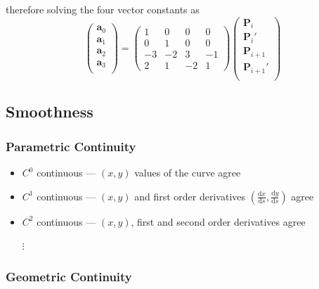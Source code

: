 \documentclass[twocolumn,landscape,10pt]{article}
\theoremstyle{definition}
\begin{document}
\begin{itemize}
\[        \]
        therefore solving the four vector constants as
        \[
            \begin{pmatrix}
                \mathbf{a}_0 \\
                \mathbf{a}_1 \\
                \mathbf{a}_2 \\
                \mathbf{a}_3 \\
            \end{pmatrix} 
            =
            \begin{pmatrix}
                1 & 0 & 0 & 0 \\
                0 & 1 & 0 & 0 \\
                -3 & -2 & 3 & -1 \\
                2 & 1 & -2 & 1
            \end{pmatrix} 
            \begin{pmatrix}
                \mathbf{P}_i \\
                \mathbf{P}_i' \\
                \mathbf{P}_{i+1} \\
                \mathbf{P}_{i+1}' \\
            \end{pmatrix} 
        \]
\end{itemize} 

\subsection{Smoothness}

\subsubsection{Parametric Continuity}

\begin{itemize}
    \item $C^0$ continuous --- $(x,y)$ values of the curve agree
    \item $C^1$ continuous --- $(x,y)$ and first order derivatives 
        $\left(\frac{\mathrm{d}x}{\mathrm{d}s},\frac{\mathrm{d}y}{\mathrm{d}s}\right)$
        agree
    \item $C^2$ continuous --- $(x,y)$, first and second order
        derivatives agree
    \item[$\vdots$]
\end{itemize} 

\subsubsection{Geometric Continuity}
\end{document}
